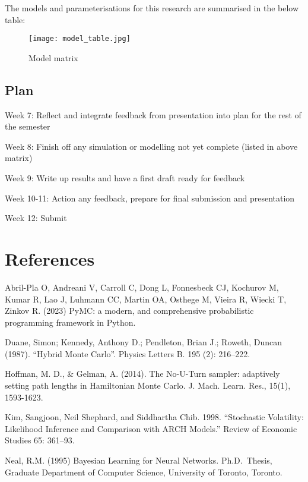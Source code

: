\documentclass[
  12pt,
  letterpaper,
  DIV=11,
  numbers=noendperiod]{scrartcl}
\begin{document}
The models and parameterisations for this research are summarised in the
below table:

\begin{figure}[H]

{\centering \texttt{[image: model\_table.jpg]}

}

\caption{Model matrix}

\end{figure}

\hypertarget{plan}{%
\subsection{Plan}\label{plan}}

Week 7: Reflect and integrate feedback from presentation into plan for
the rest of the semester

Week 8: Finish off any simulation or modelling not yet complete (listed
in above matrix)

Week 9: Write up results and have a first draft ready for feedback

Week 10-11: Action any feedback, prepare for final submission and
presentation

Week 12: Submit

\newpage{}

\hypertarget{references}{%
\section{References}\label{references}}

Abril-Pla O, Andreani V, Carroll C, Dong L, Fonnesbeck CJ, Kochurov M,
Kumar R, Lao J, Luhmann CC, Martin OA, Osthege M, Vieira R, Wiecki T,
Zinkov R. (2023) PyMC: a modern, and comprehensive probabilistic
programming framework in Python.

Duane, Simon; Kennedy, Anthony D.; Pendleton, Brian J.; Roweth, Duncan
(1987). ``Hybrid Monte Carlo''. Physics Letters B. 195 (2): 216--222.

Hoffman, M. D., \& Gelman, A. (2014). The No-U-Turn sampler: adaptively
setting path lengths in Hamiltonian Monte Carlo. J. Mach. Learn. Res.,
15(1), 1593-1623.

Kim, Sangjoon, Neil Shephard, and Siddhartha Chib. 1998. ``Stochastic
Volatility: Likelihood Inference and Comparison with ARCH Models.''
Review of Economic Studies 65: 361--93.

Neal, R.M. (1995) Bayesian Learning for Neural Networks. Ph.D.~Thesis,
Graduate Department of Computer Science, University of Toronto, Toronto.
\end{document}
